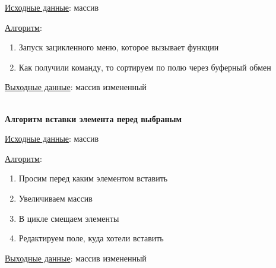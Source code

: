 \underline{Исходные данные}: массив

\underline{Алгоритм}:

\begin{enumerate}
    \item Запуск зацикленного меню, которое вызывает функции
    \item Как получили команду, то сортируем по полю через буферный обмен
\end{enumerate}

\underline{Выходные данные}: массив измененный

\hspace{0pt}\\



\textbf{Алгоритм вставки элемента перед выбраным}

\underline{Исходные данные}: массив

\underline{Алгоритм}:

\begin{enumerate}
    \item Просим перед каким элементом вставить
    \item Увеличиваем массив
    \item В цикле смещаем элементы
    \item Редактируем поле, куда хотели вставить
\end{enumerate}

\underline{Выходные данные}: массив измененный

\newpage